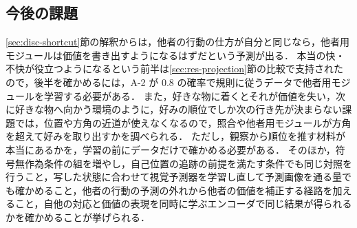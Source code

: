 \subsection{今後の課題}\label{sec:future}
\ref{sec:disc-shortcut}節の解釈からは，他者の行動の仕方が自分と同じなら，他者用モジュールは価値を書き出すようになるはずだという予測が出る．
本当の快・不快が役立つようになるという前半は\ref{sec:res-projection}節の比較で支持されたので，後半を確かめるには，A-2 が 0.8 の確率で規則に従うデータで他者用モジュールを学習する必要がある．
また，好きな物に着くとそれが価値を失い，次に好きな物へ向かう環境のように，好みの順位でしか次の行き先が決まらない課題では，位置や方角の近道が使えなくなるので，照合や他者用モジュールが方角を超えて好みを取り出すかを調べられる．
ただし，観察から順位を推す材料が本当にあるかを，学習の前にデータだけで確かめる必要がある．
そのほか，符号無作為条件の組を増やし，自己位置の追跡の前提を満たす条件でも同じ対照を行うこと，写した状態に合わせて視覚予測器を学習し直して予測画像を通る量でも確かめること，他者の行動の予測の外れから他者の価値を補正する経路を加えること，自他の対応と価値の表現を同時に学ぶエンコーダで同じ結果が得られるかを確かめることが挙げられる．
